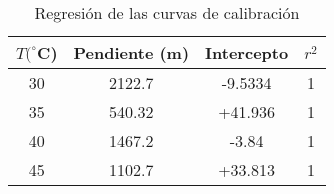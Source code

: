 \begin{table}[H]
    \centering
    \begin{tabular}{cccc}
    \hline
    $ T (^{\circ}$C) & Pendiente (m) & Intercepto & $r^{2}$ \\
    \hline
    30 & 2122.7 & -9.5334  & 1   \\
    35 & 540.32 & +41.936  & 1   \\
    40 & 1467.2 & -3.84    & 1   \\
    45 & 1102.7 & +33.813  & 1   \\
    \hline

    \end{tabular} 
    \caption{Regresión de las curvas de calibración  }
    \label{tab:regresion_calibracion}
\end{table}
